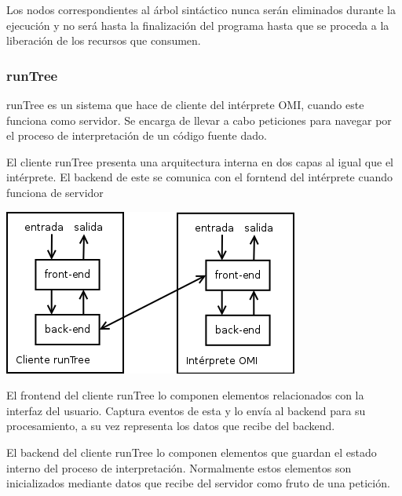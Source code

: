 Los nodos correspondientes al árbol sintáctico nunca serán eliminados durante la ejecución y no será hasta la finalización del programa hasta que se proceda a la liberación de los recursos 
que consumen.





\subsubsection{runTree}
runTree es un sistema que hace de cliente del intérprete OMI, cuando este funciona como servidor. Se encarga de llevar a cabo peticiones para navegar por el proceso de interpretación de un código
fuente dado. 

El cliente runTree presenta una arquitectura interna en dos capas al igual que el intérprete. El backend de este se comunica con el forntend del intérprete cuando funciona de servidor

\begin{center}
\includegraphics[scale=0.7]{generic_cliente_servidor.png} \\
\end{center}

El frontend del cliente runTree lo componen elementos relacionados con la interfaz del usuario. Captura eventos de esta y lo envía al backend para su procesamiento, a su vez representa los datos que recibe del backend. 

El backend del cliente runTree lo componen elementos que guardan el estado interno del proceso de interpretación. Normalmente estos elementos son inicializados mediante datos que recibe del servidor como fruto de 
una petición.





